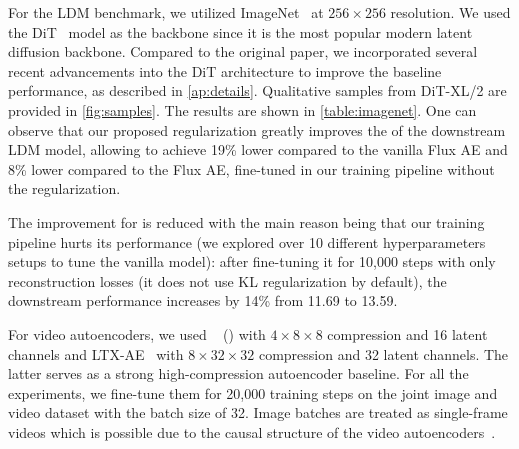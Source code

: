 For the LDM benchmark, we utilized ImageNet~\cite{ImageNet} at $256 \times 256$ resolution.
We used the DiT~\cite{DiT} model as the backbone since it is the most popular modern latent diffusion backbone.
Compared to the original paper, we incorporated several recent advancements into the DiT architecture to improve the baseline performance, as described in \cref{ap:details}.
Qualitative samples from DiT-XL/2 are provided in \cref{fig:samples}.
The results are shown in \cref{table:imagenet}.
One can observe that our proposed regularization greatly improves the \diffusability of the downstream LDM model, allowing to achieve 19\% lower \fid compared to the vanilla Flux AE and 8\% lower \fid compared to the Flux AE, fine-tuned in our training pipeline without the \regshortname regularization.

The improvement for \cmsaei is reduced with the main reason being that our training pipeline hurts its performance (we explored over 10 different hyperparameters setups to tune the vanilla model): after fine-tuning it for 10,000 steps with only reconstruction losses (it does not use KL regularization by default), the downstream \fid performance increases by 14\% from 11.69 to 13.59.

For video autoencoders, we used \cvaefull~\cite{CogVideo} (\cvae) with $4 \times 8 \times 8$ compression and 16 latent channels and LTX-AE~\cite{LTX-video} with $8 \times 32 \times 32$ compression and 32 latent channels.
The latter serves as a strong high-compression autoencoder baseline.
For all the experiments, we fine-tune them for 20,000 training steps on the joint image and video dataset with the batch size of 32.
Image batches are treated as single-frame videos which is possible due to the causal structure of the video autoencoders~\cite{MAGVITv2}.







